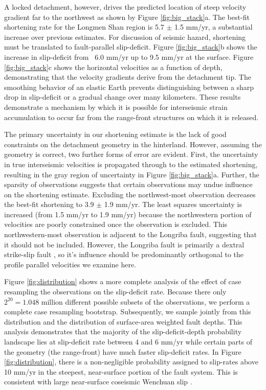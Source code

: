\documentclass[12pt]{article}
\begin{document}
A locked detachment, however, drives the predicted location of steep velocity gradient far to the northwest as shown by Figure \ref{fig:big_stack}a. The best-fit shortening rate for the Longmen Shan region is 5.7 $\pm$ 1.5 mm/yr, a substantial increase over previous estimates. For discussion of seismic hazard, shortening must be translated to fault-parallel slip-deficit. Figure \ref{fig:big_stack}b shows the increase in slip-deficit from ~6.0 mm/yr up to 9.5 mm/yr at the surface. Figure \ref{fig:big_stack}c shows the horizontal velocities as a function of depth, demonstrating that the velocity gradients derive from the detachment tip. The smoothing behavior of an elastic Earth prevents distinguishing between a sharp drop in slip-deficit or a gradual change over many kilometers. These results demonstrate a mechanism by which it is possible for interseismic strain accumulation to occur far from the range-front structures on which it is released.

The primary uncertainty in our shortening estimate is the lack of good constraints on the detachment geometry in the hinterland. However, assuming the geometry is correct, two further forms of error are evident. First, the uncertainty in true interseismic velocities is propagated through to the estimated shortening, resulting in the gray region of uncertainty in Figure \ref{fig:big_stack}a. Further, the sparsity of observations suggests that certain observations may undue influence on the shortening estimate. Excluding the northwest-most observation decreases the best-fit shortening to 3.9 $\pm$ 1.9 mm/yr. The least squares uncertainty is increased (from 1.5 mm/yr to 1.9 mm/yr) because the northwestern portion of velocities are poorly constrained once the observation is excluded. This northwestern-most observation is adjacent to the Longriba fault, suggesting that it should not be included. However, the Longriba fault is primarily a dextral strike-slip fault \citep{Ren2013}, so it's influence should be predominantly orthogonal to the profile parallel velocities we examine here.

Figure \ref{fig:distribution} shows a more complete analysis of the effect of case resampling the observations on the slip-deficit rate. Because there only $2^{20} = 1.048 $ million different possible subsets of the observations, we perform a complete case resampling bootstrap. Subsequently, we sample jointly from this distribution and the distribution of surface-area weighted fault depths. This analysis demonstrates that the majority of the slip-deficit-depth probability landscape lies at slip-deficit rate between 4 and 6 mm/yr while certain parts of the geometry (the range-front) have much faster slip-deficit rates. In Figure \ref{fig:distribution}, there is a non-negligible probability assigned to slip-rates above 10 mm/yr in the steepest, near-surface portion of the fault system. This is consistent with large near-surface coseismic Wenchuan slip \citep{Shen2009}. 
\end{document}
